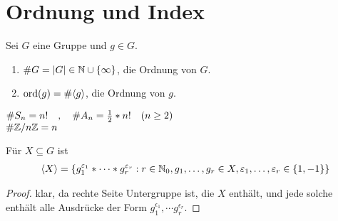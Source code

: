 \section{Ordnung und Index}

Sei $G$ eine Gruppe und $g \in G$.

\begin{defin}
	\begin{enumerate}
		\item $\# G = \left| G \right| \in \mathbb{N} \cup \{\infty\}$, die Ordnung von $G$.
		\item $\operatorname{ord}(g) = \# \langle g \rangle$, die Ordnung von $g$.
	\end{enumerate}
\end{defin}
\begin{bsp}
	$\# S_n = n! \quad , \quad \# A_n = \frac{1}{2}*n! \quad (n\geq 2)$ \\
	$\# \mathbb{Z} / n \mathbb{Z} = n$
\end{bsp}

\begin{lemma}
	Für $X \subseteq G$ ist
	\begin{align*}
		\langle X \rangle = \{ g_1^{\varepsilon_1}  * \cdots * g_r^{\varepsilon_r} : r \in \mathbb{N}_0, g_1,\dots,g_r \in X, \varepsilon_1 ,\dots, \varepsilon_r \in \{1,-1\} \}
	\end{align*}
\end{lemma}
\begin{proof}
	klar, da rechte Seite Untergruppe ist, die $X$ enthält, und jede solche enthält alle  Ausdrücke der Form $g_1^{\epsilon_1}, \cdots g_r^{\epsilon_r}$.
\end{proof}

